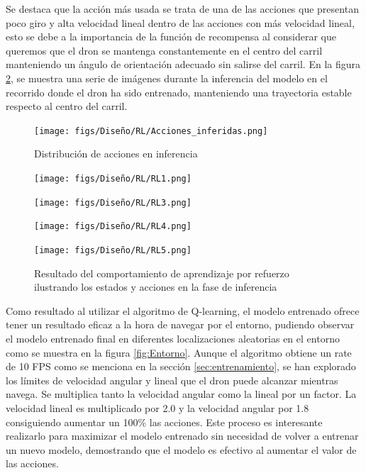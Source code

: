 Se destaca que la acción más usada se trata de una de las acciones que presentan poco giro y alta velocidad lineal dentro de las acciones con más velocidad lineal, esto se debe
a la importancia de la función de recompensa al considerar que queremos que el dron se mantenga constantemente en el centro del carril manteniendo un ángulo de orientación adecuado
sin salirse del carril. En la figura \ref{fig:inferencia-imagenes}, se muestra una serie de imágenes durante la inferencia del modelo en el recorrido donde el dron ha sido entrenado, manteniendo una trayectoria 
estable respecto al centro del carril.

\begin{figure} [H]
  \begin{center}
    \texttt{[image: figs/Diseño/RL/Acciones\_inferidas.png]}
  \end{center}
  \caption{Distribución de acciones en inferencia}
  \label{fig:Distribucción_inferencia}
\end{figure}

\begin{figure}[H]
  \centering
  \begin{minipage}{0.3\textwidth}
    \texttt{[image: figs/Diseño/RL/RL1.png]}
  \end{minipage}
  \hfill
  \begin{minipage}{0.3\textwidth}
    \texttt{[image: figs/Diseño/RL/RL3.png]}
  \end{minipage}
  \hfill
  \begin{minipage}{0.3\textwidth}
    \texttt{[image: figs/Diseño/RL/RL4.png]}
  \end{minipage}
  \hfill
  \begin{minipage}{0.3\textwidth}
    \texttt{[image: figs/Diseño/RL/RL5.png]}
  \end{minipage}
  \caption{Resultado del comportamiento de aprendizaje por refuerzo ilustrando los estados y acciones en la fase de inferencia}
  \label{fig:inferencia-imagenes}
\end{figure}

Como resultado al utilizar el algoritmo de Q-learning, el modelo entrenado ofrece tener un resultado eficaz a la hora de navegar por el entorno, pudiendo observar 
el modelo entrenado final en diferentes localizaciones aleatorias en el entorno como se muestra en la figura \ref{fig:Entorno}. 
Aunque el algoritmo obtiene un rate de 10 FPS como se menciona en la sección \ref{sec:entrenamiento}, se han explorado los límites de velocidad angular y lineal que el dron puede alcanzar mientras navega. Se multiplica tanto la velocidad angular como la lineal
por un factor. La velocidad lineal es multiplicado por 2.0 y la velocidad angular por 1.8 consiguiendo aumentar un 100\% las acciones. Este proceso es interesante realizarlo para 
maximizar el modelo entrenado sin necesidad de volver a entrenar un nuevo modelo, demostrando que el modelo es efectivo al aumentar el valor de las acciones. \newline

